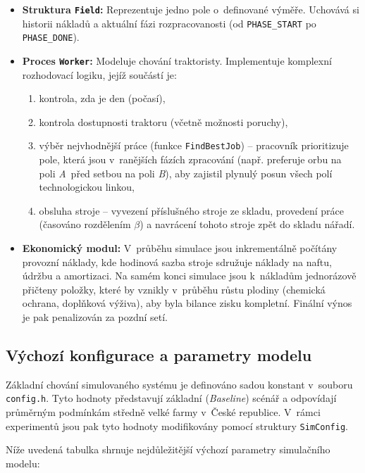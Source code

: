 \documentclass[11pt,a4paper]{article}
\begin{document}
\begin{itemize}
    \item \textbf{Struktura \texttt{Field}:} Reprezentuje jedno pole o~definované výměře. Uchovává si historii nákladů a aktuální fázi rozpracovanosti (od \texttt{PHASE\_START} po \texttt{PHASE\_DONE}).
    \item \textbf{Proces \texttt{Worker}:} Modeluje chování traktoristy. Implementuje komplexní rozhodovací logiku, jejíž součástí je:
    \begin{enumerate}
        \item kontrola, zda je den  (počasí),
        \item kontrola dostupnosti traktoru (včetně možnosti poruchy),
        \item výběr nejvhodnější práce (funkce \texttt{FindBestJob}) -- pracovník prioritizuje pole, která jsou v~ranějších fázích zpracování (např. preferuje orbu na poli \emph{A}~před setbou na poli \emph{B}), aby zajistil plynulý posun všech polí technologickou linkou,
        \item obsluha stroje -- vyvezení příslušného stroje ze skladu, provedení práce (časováno rozdělením $\beta$) a navrácení tohoto stroje zpět do skladu nářadí.
    \end{enumerate}
    \item \textbf{Ekonomický modul:} V~průběhu simulace jsou inkrementálně počítány provozní náklady, kde hodinová sazba stroje sdružuje náklady na naftu, údržbu a amortizaci. Na samém konci simulace jsou k~nákladům jednorázově přičteny položky, které by vznikly v~průběhu růstu plodiny (chemická ochrana, doplňková výživa), aby byla bilance zisku kompletní. Finální výnos je pak penalizován za pozdní setí.
\end{itemize}

\subsection{Výchozí konfigurace a parametry modelu}

Základní chování simulovaného systému je definováno sadou konstant v~souboru \texttt{config.h}. Tyto hodnoty představují základní (\emph{Baseline}) scénář a odpovídají průměrným podmínkám středně velké farmy v~České republice. V~rámci experimentů jsou pak tyto hodnoty modifikovány pomocí struktury \texttt{SimConfig}.

Níže uvedená tabulka shrnuje nejdůležitější výchozí parametry simulačního modelu:
\end{document}
